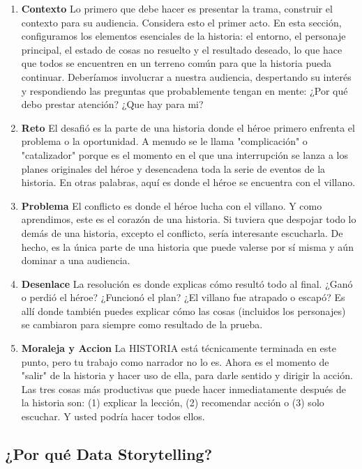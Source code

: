\documentclass[11pt]{article}
\begin{document}
\begin{enumerate}
            
        
        \item \textbf{Contexto}
			Lo primero que debe hacer es presentar la trama, construir el contexto para su audiencia. Considera esto el primer acto. En esta sección, configuramos los elementos esenciales de la historia: el entorno, el personaje principal, el estado de cosas no resuelto y el resultado deseado, lo que hace que todos se encuentren en un terreno común para que la historia pueda continuar. Deberíamos involucrar a nuestra audiencia, despertando su interés y respondiendo las preguntas que probablemente tengan en mente: ¿Por qué debo prestar atención? ¿Que hay para mi?
		\item \textbf{Reto}
			El desafió es la parte de una historia donde el héroe primero enfrenta el problema o la oportunidad. A menudo se le llama "complicación" o "catalizador" porque es el momento en el que una interrupción se lanza a los planes originales del héroe y desencadena toda la serie de eventos de la historia. En otras palabras, aquí es donde el héroe se encuentra con el villano.
		\item \textbf{Problema}
			El conflicto es donde el héroe lucha con el villano. Y como aprendimos, este es el corazón de una historia. Si tuviera que despojar todo lo demás de una historia, excepto el conflicto, sería interesante escucharla. De hecho, es la única parte de una historia que puede valerse por sí misma y aún dominar a una audiencia.
		\item \textbf{Desenlace}
			La resolución es donde explicas cómo resultó todo al final. ¿Ganó o perdió el héroe? ¿Funcionó el plan? ¿El villano fue atrapado o escapó? Es allí donde también puedes explicar cómo las cosas (incluidos los personajes) se cambiaron para siempre como resultado de la prueba.
		\item \textbf{Moraleja y Accion}
			La HISTORIA está técnicamente terminada en este punto, pero tu trabajo como narrador no lo es. Ahora es el momento de "salir" de la historia y hacer uso de ella, para darle sentido y dirigir la acción. Las tres cosas más productivas que puede hacer inmediatamente después de la historia son: (1) explicar la lección, (2) recomendar acción o (3) solo escuchar. Y usted podría hacer todos ellos.

\end{enumerate}
\subsection{¿Por qué Data Storytelling?}
\end{document}

